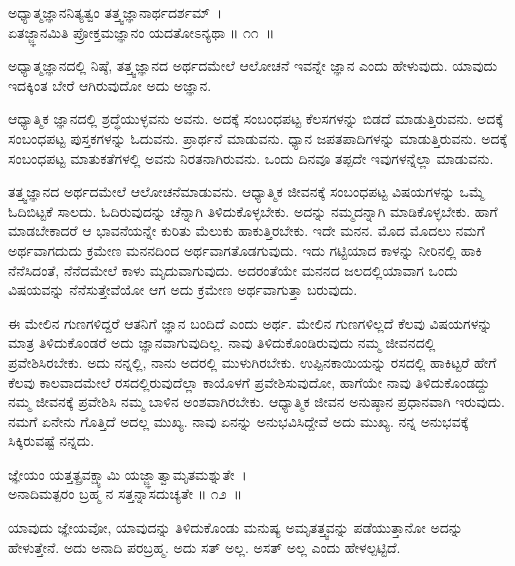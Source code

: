 \begin{shloka}
ಅಧ್ಯಾತ್ಮಜ್ಞಾನನಿತ್ಯತ್ವಂ ತತ್ತ್ವಜ್ಞಾನಾರ್ಥದರ್ಶಮ್~।\\ಏತಜ್ಜ್ಞಾನಮಿತಿ ಪ್ರೋಕ್ತಮಜ್ಞಾನಂ ಯದತೋಽನ್ಯಥಾ \hfill॥ ೧೧~॥
\end{shloka}

\begin{artha}
ಅಧ್ಯಾತ್ಮಜ್ಞಾನದಲ್ಲಿ ನಿಷ್ಠೆ, ತತ್ತ್ವಜ್ಞಾನದ ಅರ್ಥದಮೇಲೆ ಆಲೋಚನೆ ಇವನ್ನೇ ಜ್ಞಾನ ಎಂದು ಹೇಳುವುದು. ಯಾವುದು ಇದಕ್ಕಿಂತ ಬೇರೆ ಆಗಿರುವುದೋ ಅದು ಅಜ್ಞಾನ.
\end{artha}

ಆಧ್ಯಾತ್ಮಿಕ ಜ್ಞಾನದಲ್ಲಿ ಶ್ರದ್ಧೆಯುಳ್ಳವನು ಅವನು. ಅದಕ್ಕೆ ಸಂಬಂಧಪಟ್ಟ ಕೆಲಸಗಳನ್ನು ಬಿಡದೆ ಮಾಡುತ್ತಿರುವನು. ಅದಕ್ಕೆ ಸಂಬಂಧಪಟ್ಟ ಪುಸ್ತಕಗಳನ್ನು ಓದುವನು. ಪ್ರಾರ್ಥನೆ ಮಾಡುವನು. ಧ್ಯಾನ ಜಪತಪಾದಿಗಳನ್ನು ಮಾಡುತ್ತಿರುವನು. ಅದಕ್ಕೆ ಸಂಬಂಧಪಟ್ಟ ಮಾತುಕತೆಗಳಲ್ಲಿ ಅವನು ನಿರತನಾಗಿರುವನು. ಒಂದು ದಿನವೂ ತಪ್ಪದೇ ಇವುಗಳನ್ನೆಲ್ಲಾ ಮಾಡುವನು.

ತತ್ತ್ವಜ್ಞಾನದ ಅರ್ಥದಮೇಲೆ ಆಲೋಚನೆಮಾಡುವನು. ಆಧ್ಯಾತ್ಮಿಕ ಜೀವನಕ್ಕೆ ಸಂಬಂಧಪಟ್ಟ ವಿಷಯಗಳನ್ನು ಒಮ್ಮೆ ಓದಿಬಿಟ್ಟಕೆ ಸಾಲದು. ಓದಿರುವುದನ್ನು ಚೆನ್ನಾಗಿ ತಿಳಿದುಕೊಳ್ಳಬೇಕು. ಅದನ್ನು ನಮ್ಮದನ್ನಾಗಿ ಮಾಡಿಕೊಳ್ಳಬೇಕು. ಹಾಗೆ ಮಾಡಬೇಕಾದರೆ ಆ ಭಾವನೆಯನ್ನೇ ಕುರಿತು ಮೆಲುಕು ಹಾಕುತ್ತಿರಬೇಕು. ಇದೇ ಮನನ. ಮೊದ ಮೊದಲು ನಮಗೆ ಅರ್ಥವಾಗದುದು ಕ್ರಮೇಣ ಮನನದಿಂದ ಅರ್ಥವಾಗತೊಡಗುವುದು. ಇದು ಗಟ್ಟಿಯಾದ ಕಾಳನ್ನು ನೀರಿನಲ್ಲಿ ಹಾಕಿ ನೆನೆಸಿದಂತೆ, ನೆನೆದಮೇಲೆ ಕಾಳು ಮೃದುವಾಗುವುದು. ಅದರಂತೆಯೇ ಮನನದ ಜಲದಲ್ಲಿ\break ಯಾವಾಗ ಒಂದು ವಿಷಯವನ್ನು ನೆನೆಸುತ್ತೇವೆಯೋ ಆಗ ಅದು ಕ್ರಮೇಣ ಅರ್ಥವಾಗುತ್ತಾ ಬರುವುದು.

ಈ ಮೇಲಿನ ಗುಣಗಳಿದ್ದರೆ ಆತನಿಗೆ ಜ್ಞಾನ ಬಂದಿದೆ ಎಂದು ಅರ್ಥ. ಮೇಲಿನ ಗುಣಗಳಿಲ್ಲದೆ ಕೆಲವು ವಿಷಯಗಳನ್ನು ಮಾತ್ರ ತಿಳಿದುಕೊಂಡರೆ ಅದು ಜ್ಞಾನವಾಗುವುದಿಲ್ಲ. ನಾವು ತಿಳಿದು\-ಕೊಂಡಿರುವುದು ನಮ್ಮ ಜೀವನದಲ್ಲಿ ಪ್ರವೇಶಿಸಿರಬೇಕು. ಅದು ನನ್ನಲ್ಲಿ, ನಾನು ಅದರಲ್ಲಿ ಮುಳುಗಿರಬೇಕು. ಉಪ್ಪಿನಕಾಯಿಯನ್ನು ರಸದಲ್ಲಿ ಹಾಕಿಟ್ಟರೆ ಹೇಗೆ ಕೆಲವು ಕಾಲವಾದಮೇಲೆ ರಸದಲ್ಲಿರುವುದೆಲ್ಲಾ ಕಾಯೊಳಗೆ ಪ್ರವೇಶಿಸುವುದೋ, ಹಾಗೆಯೇ ನಾವು ತಿಳಿದುಕೊಂಡದ್ದು ನಮ್ಮ ಜೀವನಕ್ಕೆ ಪ್ರವೇಶಿಸಿ ನಮ್ಮ ಬಾಳಿನ ಅಂಶವಾಗಿರಬೇಕು. ಆಧ್ಯಾತ್ಮಿಕ ಜೀವನ ಅನುಷ್ಠಾನ ಪ್ರಧಾನವಾಗಿ ಇರುವುದು. ನಮಗೆ ಏನೇನು ಗೊತ್ತಿದೆ ಅದಲ್ಲ ಮುಖ್ಯ. ನಾವು ಏನನ್ನು ಅನುಭವಿಸಿದ್ದೇವೆ ಅದು ಮುಖ್ಯ. ನನ್ನ ಅನುಭವಕ್ಕೆ ಸಿಕ್ಕಿರುವಷ್ಟೆ ನನ್ನದು.\enginline{}

\begin{shloka}
ಜ್ಞೇಯಂ ಯತ್ತತ್ಪ್ರವಕ್ಷ್ಯಾಮಿ ಯಜ್ಜ್ಞಾತ್ವಾಮೃತಮಶ್ನುತೇ~।\\ಅನಾದಿಮತ್ಪರಂ ಬ್ರಹ್ಮ ನ ಸತ್ತನ್ನಾಸದುಚ್ಯತೇ \hfill॥ ೧೨~॥
\end{shloka}

\begin{artha}
ಯಾವುದು ಜ್ಞೇಯವೋ, ಯಾವುದನ್ನು ತಿಳಿದುಕೊಂಡು ಮನುಷ್ಯ ಅಮೃತತ್ತ್ವವನ್ನು ಪಡೆಯು\-ತ್ತಾನೋ ಅದನ್ನು ಹೇಳುತ್ತೇನೆ. ಅದು ಅನಾದಿ ಪರಬ್ರಹ್ಮ. ಅದು ಸತ್ ಅಲ್ಲ. ಅಸತ್ ಅಲ್ಲ ಎಂದು ಹೇಳಲ್ಪಟ್ಟಿದೆ.
\end{artha}

